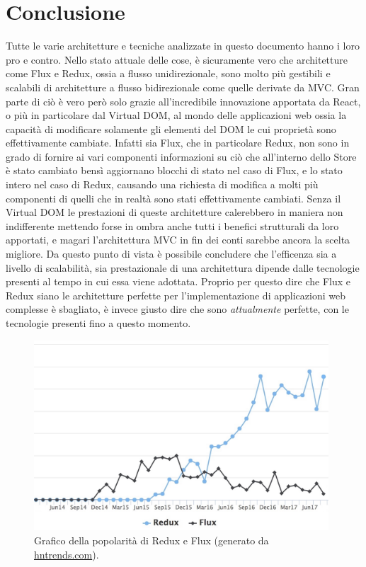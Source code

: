 \chapter{Conclusione}
Tutte le varie architetture e tecniche analizzate in questo documento hanno i loro pro e contro. Nello stato attuale delle cose, è sicuramente vero che architetture come Flux e Redux, ossia a flusso unidirezionale, sono molto più gestibili e scalabili di architetture a flusso bidirezionale come quelle derivate da MVC.
Gran parte di ciò è vero però solo grazie all'incredibile innovazione apportata da React, o più in particolare dal Virtual DOM, al mondo delle applicazioni web ossia la capacità di modificare solamente gli elementi del DOM le cui proprietà sono effettivamente cambiate. Infatti sia Flux, che in particolare Redux, non sono in grado di fornire ai vari componenti informazioni su ciò che all'interno dello Store è stato cambiato bensì aggiornano blocchi di stato nel caso di Flux, e lo stato intero nel caso di Redux, causando una richiesta di modifica a molti più componenti di quelli che in realtà sono stati effettivamente cambiati.
Senza il Virtual DOM le prestazioni di queste architetture calerebbero in maniera non indifferente mettendo forse in ombra anche tutti i benefici strutturali da loro apportati, e magari l'architettura MVC in fin dei conti sarebbe ancora la scelta migliore.
Da questo punto di vista è possibile concludere che l'efficenza sia a livello di scalabilità, sia prestazionale di una architettura dipende dalle tecnologie presenti al tempo in cui essa viene adottata. Proprio per questo dire che Flux e Redux siano le architetture perfette per l'implementazione di applicazioni web complesse è sbagliato, è invece giusto dire che sono \textit{attualmente} perfette, con le tecnologie presenti fino a questo momento.

\begin{figure}[h]
\centering 
\vspace*{0.5cm} 
\includegraphics[width=11cm]{./images/fluxVsReduxPopularity}
\caption{Grafico della popolarità di Redux e Flux (generato da \href{https://www.hntrends.com/}{hntrends.com}).}
\label{fluxVsReduxPopularity}
\vspace*{0.5cm} 
\end{figure}

